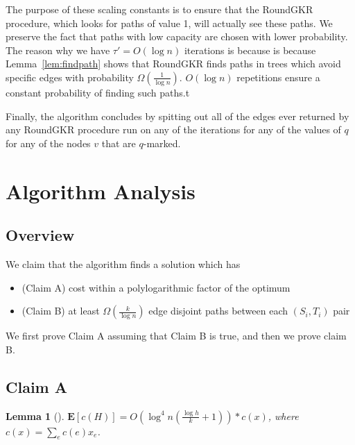 \documentclass[12pt]{article}
\newtheorem{lemma}{Lemma}
\begin{document}
The purpose of these scaling constants is to ensure that the RoundGKR procedure, which looks for paths of value 1, will actually see these paths. We preserve the fact that paths with low capacity are chosen with lower probability. The reason why we have $\tau' = O(\log n)$ iterations is because is because  Lemma~\ref{lem:findpath} shows that RoundGKR finds paths in trees which avoid specific edges with probability $\Omega(\frac{1}{\log n})$. $O(\log n)$ repetitions ensure a constant probability of finding such paths.t

Finally, the algorithm concludes by spitting out all of the edges ever returned by any RoundGKR procedure run on any of the iterations for any of the values of $q$ for any of the nodes $v$ that are $q$-marked.
%

\section{Algorithm Analysis}

\subsection{Overview}

We claim that the algorithm finds a solution which has
\begin{itemize}
\item (Claim A) cost within a polylogarithmic factor of the optimum
\item (Claim B) at least $\Omega(\frac{k}{\log n})$ edge disjoint paths between each $(S_i, T_i)$ pair
\end{itemize}

We first prove Claim A assuming that Claim B is true, and then we prove claim B.


\subsection{Claim A}

\begin{lemma}[\cite{ssc}]
\label{lem:cost}
$\textbf{E}[c(H)] = O(\log^4n(\frac{\log h}{k}+1)) * c(x)$, where $c(x) = \sum_e c(e)x_e$. 
\end{lemma}
\end{document}
